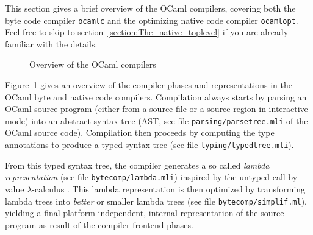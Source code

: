 \documentclass[10pt,a4paper,draft,twocolumn]{article}
\begin{document}
This section gives a brief overview of the OCaml compilers, covering both the byte code compiler
\texttt{ocamlc} and the optimizing native code compiler \texttt{ocamlopt}.
Feel free to skip to section~\ref{section:The_native_toplevel} if you are already familiar with the details.

\begin{figure}[htb]
  \centering
  \caption{Overview of the OCaml compilers}
  \label{fig:Overview_of_the_OCaml_compilers}
\end{figure}

Figure~\ref{fig:Overview_of_the_OCaml_compilers} gives an overview of the compiler phases
and representations in the OCaml byte and native code compilers. Compilation always starts
by parsing an OCaml source program (either from a source file or a source region in
interactive mode) into an abstract syntax tree (AST, see file \texttt{parsing/parsetree.mli}
of the OCaml source code). Compilation then proceeds by computing the type annotations to
produce a typed syntax tree (see file \texttt{typing/typedtree.mli}).

From this typed syntax tree, the compiler generates a so called \emph{lambda representation} (see file
\texttt{bytecomp/lambda.mli}) inspired by the untyped call-by-value $\lambda$-calculus
\cite{Appel98ml,Jones87,Michaelson89}. This lambda representation is then optimized by
transforming lambda trees into \emph{better} or smaller lambda trees (see file
\texttt{bytecomp/simplif.ml}), yielding a final platform independent, internal
representation of the source program as result of the compiler frontend phases.
\end{document}
